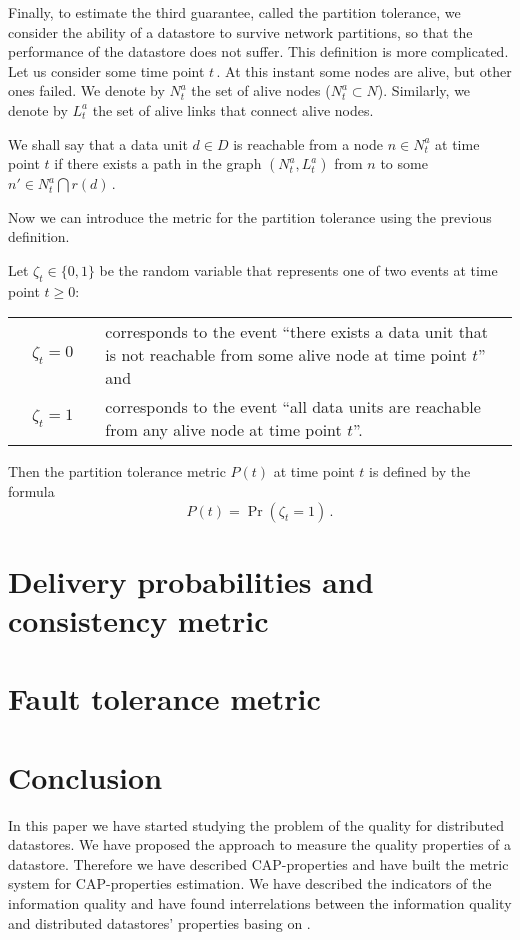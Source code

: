 \documentclass{llncs}
\begin{document}
Finally, to estimate the third guarantee, called the partition tolerance, 
we consider the ability of a datastore to survive network partitions, so that
the performance of the datastore does not suffer. 
This definition is more complicated. 
\\
Let us consider some time point $t$\,.
At this instant some nodes are alive, but other ones failed.
We denote by $N_t^a$ the set of alive nodes ($N_t^a\subset N$).
Similarly, we denote by $L_t^a$ the set of alive links that connect alive nodes.
\begin{definition}
We shall say that a data unit $d\in D$ is reachable from a node $n\in N_t^a$ at time point $t$
if there exists a path in the graph $(N_t^a,L_t^a)$ from $n$ to some $n'\in N_t^a\bigcap r(d)$\,.
\end{definition}
Now we can introduce the metric for the partition tolerance using the previous definition.
\begin{definition}
Let $\zeta_t\in\{0,1\}$ be the random variable that represents one of two events at
time point $t\geq 0$:\\
\begin{tabular*}{\textwidth}{p{0.5cm}cp{0.5cm}p{}}
&$\zeta_t=0$ && corresponds to the event ``there exists a data unit that is not reachable from
	some alive node at time point $t$'' and\\
&$\zeta_t=1$ && corresponds to the event ``all data units are reachable from any alive node
	at time point $t$''.
\end{tabular*}
Then the partition tolerance metric $P(t)$ at time point $t$ is defined by the formula
\begin{equation}
	P(t)=\Pr(\zeta_t=1)\,.
\end{equation}
\end{definition}

\section{Delivery probabilities and consistency metric}
\section{Fault tolerance metric}
\section{Conclusion}\label{sec:conclusion}

In this paper we have started studying the problem of the quality for distributed datastores. 
We have proposed the approach to measure the quality properties of a datastore. 
Therefore we have described CAP-properties and have built the metric system for CAP-properties
estimation. 
We have described the indicators of the information quality and have found interrelations between the information quality and distributed datastores' properties basing on \cite{bib:iq_main}. 
 
\end{document}
